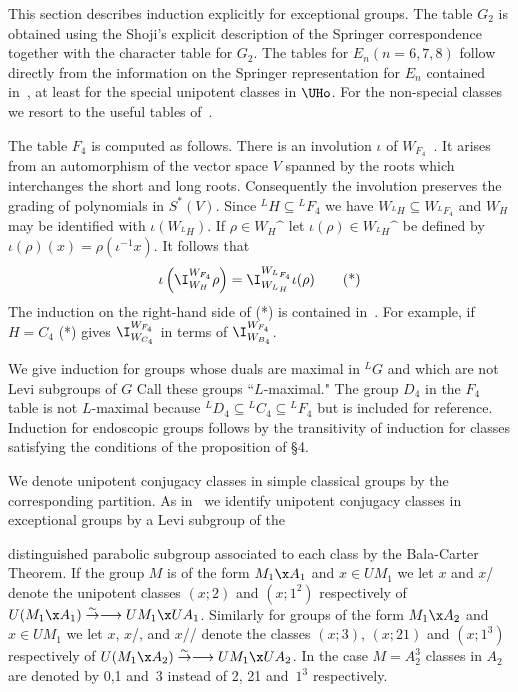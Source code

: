 
\bigskip

This section describes induction explicitly for exceptional
groups.  The
table $G_2$ is obtained using the Shoji's explicit description
of the Springer correspondence together with the character table
for $G_2$.  
The tables for $E_n (n = 6,7,8)$ follow directly from the
information on the Springer representation for $E_n$ contained 
in~\cite{AL}, at least for the special unipotent classes in
$\UHo$.
For the non-special classes we resort to the useful tables
of~\cite{A}.

The table $F_4$ is computed as follows.  There is an involution
$\iota$
of $W_{F_4}$~\cite{K}.  It arises from an automorphism of the
vector space
$V$ spanned by the roots which interchanges the short and long
roots.
Consequently the involution preserves the grading of polynomials
in
$S^*(V)$.  Since ${}^L H \subseteq {}^L F_4$ we have
$W_{{}^L H} \subseteq W_{{}^L F_4}$ and $W_H$ may be identified
with
$\iota(W_{{}^L H})$.  If $\rho \in W_H\sphat$ let 
$\iota(\rho) \in W_{{}^L H}\sphat$ be defined by 
$\iota(\rho)(x) = \rho( \iota^{-1} x)$.  It follows that
     $$
     \iota \left( \I_{W_H}^{W_{F_4}} \rho \right) = 
          \I_{W_{{}^L H}}^{W_{{}^L F_4}} \iota(\rho)
     \tag *
     $$
The induction on the right-hand side of (*) is contained
in~\cite{A}.  For
example, if $H = C_4$ (*) gives $\I_{W_{C_4}}^{W_{F_4}}$ in terms
of
$\I_{W_{B_4}}^{W_{F_4}}$.

We give induction for groups whose duals are maximal in ${}^L G$
and which are
not Levi subgroups of $G$  Call these groups ``$L$-maximal."  The
group
$D_4$ in the $F_4$ table is not $L$-maximal because
${}^L D_4 \subseteq {}^L C_4 \subseteq {}^L F_4$ but is included
for 
reference.  Induction for endoscopic groups follows 
by the transitivity of induction for classes satisfying the
conditions of
the proposition of \S 4.

We denote unipotent conjugacy classes in simple classical groups
by the
corresponding partition.  As in~\cite{C} we identify unipotent
conjugacy classes in exceptional groups by a Levi subgroup of the

distinguished parabolic subgroup associated to each class by the
Bala-Carter
Theorem.  If the group $M$ is of the form $M_1 \x A_1$ and $x \in
UM_1$ we let
$x$ and $x$/ denote the unipotent classes $(x;2)$ and $(x;1^2)$
respectively
of $U(M_1 \x A_1) \overset \sim \to \longrightarrow UM_1 \x
UA_1$.  
Similarly
for groups of the form $M_1 \x A_2$ and $x \in UM_1$ we let $x$,
$x$/, and 
$x$// denote the classes $(x;3)$, $(x;21)$ and $(x;1^3)$
respectively of
$U(M_1 \x A_2) \overset \sim \to \longrightarrow UM_1 \x UA_2$.
In the case $M = A_2^3$ classes in $A_2$ are denoted by 0,1 and~3
instead
of 2, 21 and~$1^3$ respectively.

